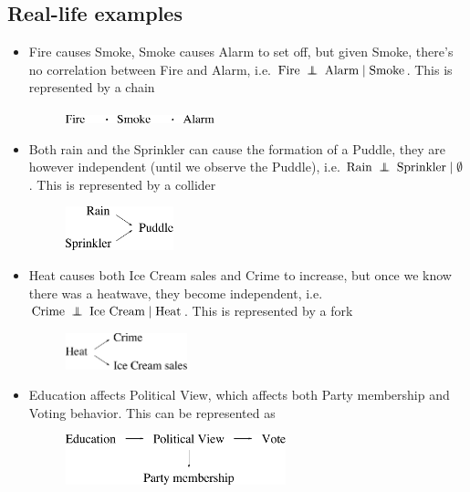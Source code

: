 \subsection{Real-life examples}
\begin{itemize}
	\item Fire causes Smoke, Smoke causes Alarm to set off, but given Smoke, there's no correlation between Fire and Alarm, i.e. $\text{Fire}\;\independent\;\text{Alarm}\;|\;\text{Smoke}$. This is represented by a chain
	\begin{figure}[h!]
	\centering
		\includegraphics[height=2.5mm]{./figs/04-fire-smoke-alarm.pdf} 
	\end{figure}

	\item Both rain and the Sprinkler can cause the formation of a Puddle, they are however independent (until we observe the Puddle), i.e. $\text{Rain}\;\independent\;\text{Sprinkler}\;|\;\emptyset$. This is represented by a collider
	\begin{figure}[h!]
	\centering
		\includegraphics[height=12.5mm]{./figs/04-rain-puddle-sprinkler.pdf} 
	\end{figure}

	\item Heat causes both Ice Cream sales and Crime to increase, but once we know there was a heatwave, they become independent, i.e. $\text{Crime}\;\independent\;\text{Ice Cream}\;|\;\text{Heat}$. This is represented by a fork
	\begin{figure}[h!]
	\centering
		\includegraphics[height=10.5mm]{./figs/04-heat-icecream-crime.pdf} 
	\end{figure}

	\item Education affects Political View, which affects both Party membership and Voting behavior. This can be represented as
	\begin{figure}[h!]
	\centering
		\includegraphics[height=14.4mm]{./figs/04-education-vote.pdf} 
	\end{figure}


\end{itemize}
